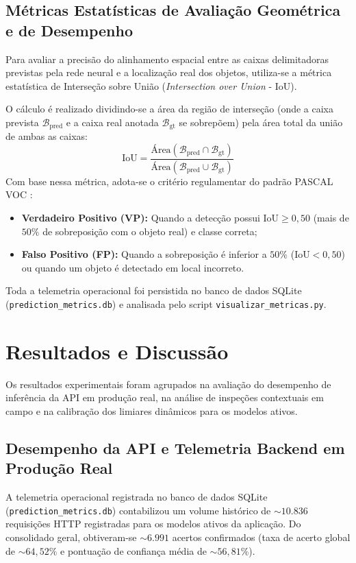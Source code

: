 \documentclass[a4paper,11pt]{article}
\begin{document}
\subsection*{Métricas Estatísticas de Avaliação Geométrica e de Desempenho}
Para avaliar a precisão do alinhamento espacial entre as caixas delimitadoras previstas pela rede neural e a localização real dos objetos, utiliza-se a métrica estatística de Interseção sobre União (\textit{Intersection over Union} - IoU). 

O cálculo é realizado dividindo-se a área da região de interseção (onde a caixa prevista $\mathcal{B}_{\text{pred}}$ e a caixa real anotada $\mathcal{B}_{\text{gt}}$ se sobrepõem) pela área total da união de ambas as caixas:
\begin{equation} \label{eq:iou}
\text{IoU} = \frac{\text{Área}(\mathcal{B}_{\text{pred}} \cap \mathcal{B}_{\text{gt}})}{\text{Área}(\mathcal{B}_{\text{pred}} \cup \mathcal{B}_{\text{gt}})}
\end{equation}
Com base nessa métrica, adota-se o critério regulamentar do padrão PASCAL VOC \cite{everingham2010pascal}:
\begin{itemize}[noitemsep,topsep=2pt,parsep=0pt,partopsep=0pt]
    \item \textbf{Verdadeiro Positivo (VP):} Quando a detecção possui $\text{IoU} \ge 0{,}50$ (mais de $50\%$ de sobreposição com o objeto real) e classe correta;
    \item \textbf{Falso Positivo (FP):} Quando a sobreposição é inferior a $50\%$ ($\text{IoU} < 0{,}50$) ou quando um objeto é detectado em local incorreto.
\end{itemize}
Toda a telemetria operacional foi persistida no banco de dados SQLite (\texttt{prediction\_metrics.db}) e analisada pelo script \texttt{visualizar\_metricas.py}.

\section*{Resultados e Discussão}
Os resultados experimentais foram agrupados na avaliação do desempenho de inferência da API em produção real, na análise de inspeções contextuais em campo e na calibração dos limiares dinâmicos para os modelos ativos.

\subsection*{Desempenho da API e Telemetria Backend em Produção Real}
A telemetria operacional registrada no banco de dados SQLite (\texttt{prediction\_metrics.db}) contabilizou um volume histórico de $\sim 10.836$ requisições HTTP registradas para os modelos ativos da aplicação. Do consolidado geral, obtiveram-se $\sim 6.991$ acertos confirmados (taxa de acerto global de $\sim 64{,}52\%$ e pontuação de confiança média de $\sim 56{,}81\%$).
\end{document}
